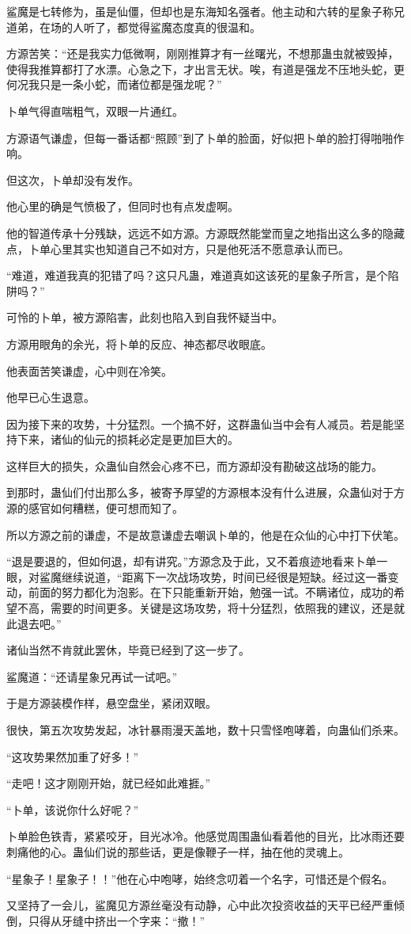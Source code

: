 \begin{this_body}
鲨魔是七转修为，虽是仙僵，但却也是东海知名强者。他主动和六转的星象子称兄道弟，在场的人听了，都觉得鲨魔态度真的很温和。

方源苦笑：“还是我实力低微啊，刚刚推算才有一丝曙光，不想那蛊虫就被毁掉，使得我推算都打了水漂。心急之下，才出言无状。唉，有道是强龙不压地头蛇，更何况我只是一条小蛇，而诸位都是强龙呢？”

卜单气得直喘粗气，双眼一片通红。

方源语气谦虚，但每一番话都“照顾”到了卜单的脸面，好似把卜单的脸打得啪啪作响。

但这次，卜单却没有发作。

他心里的确是气愤极了，但同时也有点发虚啊。

他的智道传承十分残缺，远远不如方源。方源既然能堂而皇之地指出这么多的隐藏点，卜单心里其实也知道自己不如对方，只是他死活不愿意承认而已。

“难道，难道我真的犯错了吗？这只凡蛊，难道真如这该死的星象子所言，是个陷阱吗？”

可怜的卜单，被方源陷害，此刻也陷入到自我怀疑当中。

方源用眼角的余光，将卜单的反应、神态都尽收眼底。

他表面苦笑谦虚，心中则在冷笑。

他早已心生退意。

因为接下来的攻势，十分猛烈。一个搞不好，这群蛊仙当中会有人减员。若是能坚持下来，诸仙的仙元的损耗必定是更加巨大的。

这样巨大的损失，众蛊仙自然会心疼不已，而方源却没有勘破这战场的能力。

到那时，蛊仙们付出那么多，被寄予厚望的方源根本没有什么进展，众蛊仙对于方源的感官如何糟糕，便可想而知了。

所以方源之前的谦虚，不是故意谦虚去嘲讽卜单的，他是在众仙的心中打下伏笔。

“退是要退的，但如何退，却有讲究。”方源念及于此，又不着痕迹地看来卜单一眼，对鲨魔继续说道，“距离下一次战场攻势，时间已经很是短缺。经过这一番变动，前面的努力都化为泡影。在下只能重新开始，勉强一试。不瞒诸位，成功的希望不高，需要的时间更多。关键是这场攻势，将十分猛烈，依照我的建议，还是就此退去吧。”

诸仙当然不肯就此罢休，毕竟已经到了这一步了。

鲨魔道：“还请星象兄再试一试吧。”

于是方源装模作样，悬空盘坐，紧闭双眼。

很快，第五次攻势发起，冰针暴雨漫天盖地，数十只雪怪咆哮着，向蛊仙们杀来。

“这攻势果然加重了好多！”

“走吧！这才刚刚开始，就已经如此难捱。”

“卜单，该说你什么好呢？”

卜单脸色铁青，紧紧咬牙，目光冰冷。他感觉周围蛊仙看着他的目光，比冰雨还要刺痛他的心。蛊仙们说的那些话，更是像鞭子一样，抽在他的灵魂上。

“星象子！星象子！！”他在心中咆哮，始终念叨着一个名字，可惜还是个假名。

又坚持了一会儿，鲨魔见方源丝毫没有动静，心中此次投资收益的天平已经严重倾倒，只得从牙缝中挤出一个字来：“撤！”

\end{this_body}

